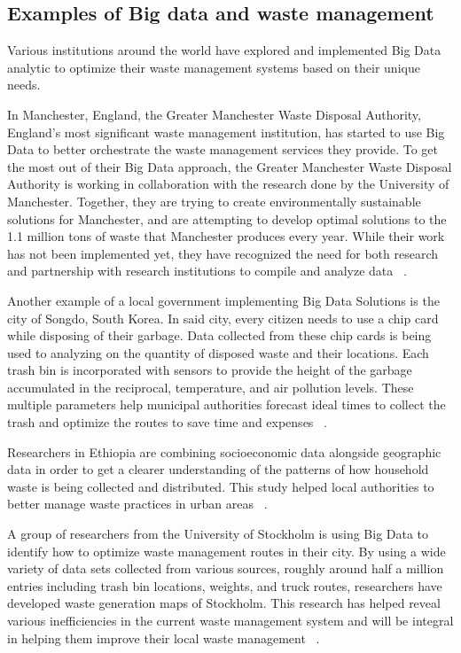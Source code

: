 \documentclass[sigconf]{acmart}
\begin{document}
\subsection{ Examples of Big data and waste management}

Various institutions around the world have explored and implemented Big Data analytic to optimize their waste management systems based on their unique needs.

In Manchester, England, the Greater Manchester Waste Disposal Authority, England's most significant waste management institution, has started to use Big Data to better orchestrate the waste management services they provide. To get the most out of their Big Data approach, the Greater Manchester Waste Disposal Authority is working in collaboration with the research done by the University of Manchester. Together, they are trying to create environmentally sustainable solutions for Manchester, and are attempting to develop optimal solutions to the 1.1 million tons of waste that Manchester produces every year.   While their work has not been implemented yet, they have recognized the need for both research and partnership with research institutions to compile and analyze data ~\cite{markvan2016}.

Another example of a local government implementing Big Data Solutions is the city of  Songdo, South Korea. In said city, every citizen needs to use a chip card while disposing of their garbage. Data collected from these chip cards is being used to analyzing on the quantity of disposed waste and their locations. Each trash bin is incorporated with sensors to provide the height of the garbage accumulated in the reciprocal, temperature, and air pollution levels. These multiple parameters help municipal authorities forecast ideal times to collect the trash and optimize the routes to save time and expenses ~\cite{markvan2016}.

Researchers in Ethiopia are combining socioeconomic data alongside geographic data in order to get a clearer understanding of the patterns of how household waste is being collected and distributed. This study helped local authorities to better manage waste practices in urban areas ~\cite{markvan2016}. 

A group of researchers from the University of Stockholm is using Big Data to identify how to optimize waste management routes in their city. By using a wide variety of data sets collected from various sources, roughly around half a million entries including trash bin locations, weights, and truck routes, researchers have developed waste generation maps of Stockholm. This research has helped reveal various inefficiencies in the current waste management system and will be integral in helping them improve their local waste management ~\cite{markvan2016}.
\end{document}
